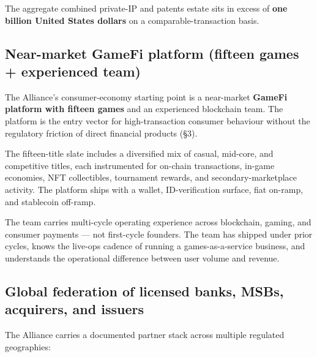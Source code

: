 The aggregate combined private-IP and patents estate sits in excess of
\textbf{one billion United States dollars} on a comparable-transaction
basis.

\subsection{Near-market GameFi platform (fifteen games + experienced team)}

The Alliance's consumer-economy starting point is a near-market
\textbf{GameFi platform with fifteen games} and an experienced blockchain
team. The platform is the entry vector for high-transaction consumer
behaviour without the regulatory friction of direct financial products
(\S 3).

The fifteen-title slate includes a diversified mix of casual,
mid-core, and competitive titles, each instrumented for on-chain
transactions, in-game economies, NFT collectibles, tournament rewards, and
secondary-marketplace activity. The platform ships with a wallet,
ID-verification surface, fiat on-ramp, and stablecoin off-ramp.

The team carries multi-cycle operating experience across blockchain,
gaming, and consumer payments --- not first-cycle founders. The team has
shipped under prior cycles, knows the live-ops cadence of running a
games-as-a-service business, and understands the operational difference
between user volume and revenue.

\subsection{Global federation of licensed banks, MSBs, acquirers, and issuers}

The Alliance carries a documented partner stack across multiple regulated
geographies:

